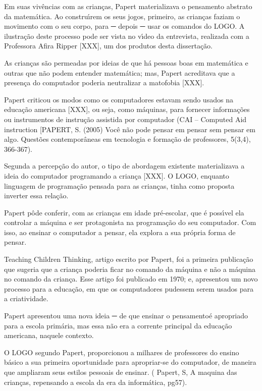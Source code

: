 \documentclass[
12pt,		%
openright,	%
twoside,  %
a4paper,			%
chapter=TITLE,		%
english,			%
french,				%
spanish,			%
brazil				%
]{USPSC-classe/USPSC}
\begin{document}
Em suas viv\^encias com as crian\c{c}as, Papert materializava o pensamento abstrato da matem\'atica. Ao constru\'{\i}rem os seus jogos, primeiro, as crian\c{c}as faziam o movimento com o seu corpo, para ─ depois  ─ usar os comandos do LOGO. A ilustra\c{c}\~ao deste processo pode ser vista no v\'{\i}deo  da entrevista, realizada com a Professora Afira Ripper [XXX],  um dos produtos desta disserta\c{c}\~ao.


As crian\c{c}as s\~ao permeadas por ideias de que h\'a pessoas boas em matem\'atica e outras que n\~ao podem entender matem\'atica; mas, Papert acreditava que a presen\c{c}a do computador poderia neutralizar a matofobia [XXX].


Papert criticou os modos como os computadores estavam sendo usados na educa\c{c}\~ao americana [XXX], ou seja, como m\'aquinas, para fornecer informa\c{c}\~oes ou instrumentos de instru\c{c}\~ao assistida por computador (CAI – Computed Aid instruction [PAPERT, S. (2005) Voc\^e n\~ao pode pensar em pensar sem pensar em algo. Quest\~oes contempor\^aneas em tecnologia e forma\c{c}\~ao de professores, 5(3,4), 366-367).


Segunda a percep\c{c}\~ao do autor, o tipo de abordagem existente materializava a ideia do computador programando a crian\c{c}a [XXX]. O LOGO, enquanto linguagem de programa\c{c}\~ao pensada para as crian\c{c}as, tinha como proposta inverter essa rela\c{c}\~ao.


Papert p\^ode conferir, com as crian\c{c}as em idade pr\'e-escolar, que \'e poss\'{\i}vel ela controlar a m\'aquina e ser protagonista na programa\c{c}\~ao do seu computador. Com isso, ao ensinar o computador a pensar, ela explora a sua pr\'opria forma de pensar.


Teaching Children Thinking, artigo escrito por Papert, foi a primeira publica\c{c}\~ao que sugeria que a crian\c{c}a poderia ficar no comando da m\'aquina e n\~ao a m\'aquina no comando da crian\c{c}a.  Esse artigo  foi publicado em 1970; e,  apresentou um novo processo para a educa\c{c}\~ao, em que os computadores pudessem serem usados para a criatividade.


Papert apresentou uma nova ideia  ─ de que \textquotedbl ensinar o pensamento\textquotedbl   \'e apropriado para a escola prim\'aria, mas essa n\~ao era a corrente principal da educa\c{c}\~ao americana, naquele contexto.


O LOGO segundo Papert,  proporcionou a milhares de professores do ensino b\'asico a sua primeira oportunidade para apropriar-se do computador, de maneira que ampliaram seus estilos pessoais de ensinar. ( Papert, S, \textquotedbl A maquina das crian\c{c}as, repensando a escola da era da inform\'atica\textquotedbl  , pg57).
\end{document}
